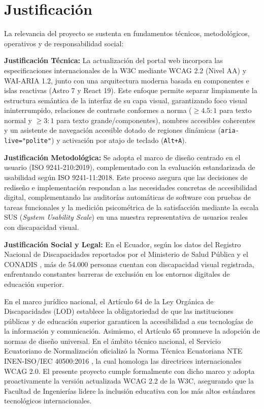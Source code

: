 \section{Justificación}
La relevancia del proyecto se sustenta en fundamentos técnicos, metodológicos, operativos y de responsabilidad social:

\textbf{Justificación Técnica:} La actualización del portal web incorpora las especificaciones internacionales de la W3C mediante WCAG 2.2 (Nivel AA) y WAI-ARIA 1.2, junto con una arquitectura moderna basada en componentes e islas reactivas (Astro 7 y React 19). Este enfoque permite separar limpiamente la estructura semántica de la interfaz de su capa visual, garantizando foco visual ininterrumpido, relaciones de contraste conformes a norma ($\ge 4.5:1$ para texto normal y $\ge 3:1$ para texto grande/componentes), nombres accesibles coherentes y un asistente de navegación accesible dotado de regiones dinámicas (\texttt{aria-live="polite"}) y activación por atajo de teclado (\texttt{Alt+A}).

\textbf{Justificación Metodológica:} Se adopta el marco de diseño centrado en el usuario (ISO 9241-210:2019), complementado con la evaluación estandarizada de usabilidad según ISO 9241-11:2018. Este proceso asegura que las decisiones de rediseño e implementación respondan a las necesidades concretas de accesibilidad digital, complementando las auditorías automáticas de software con pruebas de tareas funcionales y la medición psicométrica de la satisfacción mediante la escala SUS (\textit{System Usability Scale}) en una muestra representativa de usuarios reales con discapacidad visual.

\textbf{Justificación Social y Legal:} En el Ecuador, según los datos del Registro Nacional de Discapacidades reportados por el Ministerio de Salud Pública y el CONADIS \cite{conadis2023estadisticas}, más de 54.000 personas cuentan con discapacidad visual registrada, enfrentando constantes barreras de exclusión en los entornos digitales de educación superior.

En el marco jurídico nacional, el Artículo 64 de la Ley Orgánica de Discapacidades (LOD) \cite{lod_ecuador} establece la obligatoriedad de que las instituciones públicas y de educación superior garanticen la accesibilidad a sus tecnologías de la información y comunicación. Asimismo, el Artículo 65 promueve la adopción de normas de diseño universal. En el ámbito técnico nacional, el Servicio Ecuatoriano de Normalización oficializó la Norma Técnica Ecuatoriana NTE INEN-ISO/IEC 40500:2016 \cite{inen40500}, la cual homologa las directrices internacionales WCAG 2.0. El presente proyecto cumple formalmente con dicho marco y adopta proactivamente la versión actualizada WCAG 2.2 de la W3C, asegurando que la Facultad de Ingenierías lidere la inclusión educativa con los más altos estándares tecnológicos internacionales.

